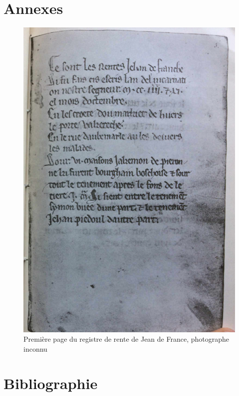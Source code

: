\chapter{Annexes}
\begin{figure}[ht] %
    \centering
    \includegraphics[scale=1]{5.Appendix/Img/escris.png} 
    \caption{Première page du registre de rente de Jean de France, photographe inconnu}
\end{figure}
%







\listoffigures
\listoftables
\chapter{Bibliographie}
\nocite{*}
\printbibliography